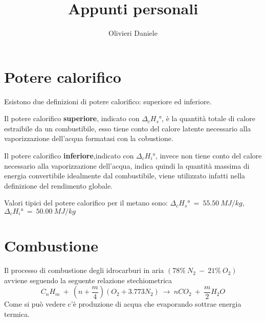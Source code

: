 \documentclass[a4paper,10pt]{article}
\title{Appunti personali}
\author{Olivieri Daniele}
\begin{document}
\maketitle
\section{Potere calorifico}
\label{sec:potere_calorifico}
Esistono due definizioni di potere calorifico: superiore ed inferiore.

Il potere calorifico \textbf{superiore}, indicato con $\Delta_c H_s\text{°}$, è la quantità totale di calore estraibile da un combustibile, esso tiene conto del calore latente necessario alla vaporizzazione dell'acqua formatasi con la cobustione.

Il potere calorifico \textbf{inferiore},indicato con $\Delta_c H_i\text{°}$, invece non tiene conto del calore necessario alla vaporizzazione dell'acqua, indica quindi la quantità massima di energia convertibile idealmente dal combustibile, viene utilizzato infatti nella definizione del rendimento globale.

Valori tipici del potere calorifico per il metano sono: $\Delta_c H_s\text{°}\ =\ 55.50\ MJ/kg$, $\Delta_c H_i\text{°}\ =\ 50.00\ MJ/kg$

\section{Combustione}
\label{sec:combustione}
Il processo di combustione degli idrocarburi in aria $\left(78\%\ N_2\ -\ 21\%\ O_2 \right)$ avviene seguendo la seguente relazione stechiometrica
\[C_n H_m\ +\ \left(n+\frac{m}{4}\right)\left(O_2+3.773N_2\right)\ \rightarrow\ nCO_2\ +\ \frac{m}{2}H_2O \]
Come si può vedere c'è produzione di acqua che evaporando sottrae energia termica.
\end{document}
